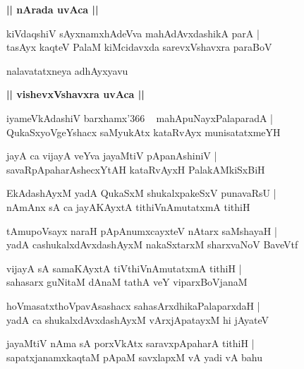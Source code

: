 \documentclass[twoside,12pt,openright]{book}
\newcounter{shloka}[chapter]
\def\uvaca#1{\centerline{{\large\textbf{#1}}}}
\begin{document}
\uvaca{|| nArada uvAca ||}

\begin{shloka}%
kiVdaqshiV sAyxnamxhAdeVva mahAdAvxdashikA parA |\\
tasAyx kaqteV PalaM kiMcidavxda sarevxVshavxra paraBoV
\end{shloka}

\begin{center}
nalavatatxneya adhAyxyavu
\end{center}

\uvaca{|| vishevxVshavxra uvAca ||}

\begin{shloka}%
iyameVkAdashiV barxhamx\char'366 ~ mahApuNayxPalaparadA |\\
QukaSxyoVgeYshacx saMyukAtx kataRvAyx munisatatxmeYH
\end{shloka}

\begin{shloka}%
jayA ca vijayA veYva jayaMtiV pApanAshiniV |\\
savaRpApaharAshecxYtAH kataRvAyxH PalakAMkiSxBiH
\end{shloka}

\begin{shloka}%
EkAdashAyxM yadA QukaSxM shukalxpakeSxV punavaRsU |\\
nAmAnx sA ca jayAKAyxtA tithiVnAmutatxmA tithiH
\end{shloka}

\begin{shloka}%
tAmupoVsayx naraH pApAnumxcayxteV nAtarx saMshayaH |\\
yadA cashukalxdAvxdashAyxM nakaSxtarxM sharxvaNoV BaveVtf
\end{shloka}

\begin{shloka}%
vijayA sA samaKAyxtA tiVthiVnAmutatxmA tithiH |\\
sahasarx guNitaM dAnaM tathA veY viparxBoVjanaM
\end{shloka}

\begin{shloka}%
hoVmasatxthoVpavAsashacx sahasArxdhikaPalaparxdaH |\\
yadA ca shukalxdAvxdashAyxM vArxjApatayxM hi jAyateV
\end{shloka}

\begin{shloka}%
jayaMtiV nAma sA porxVkAtx saravxpApaharA tithiH |\\
sapatxjanamxkaqtaM pApaM savxlapxM vA yadi vA bahu
\end{shloka}
\end{document}
